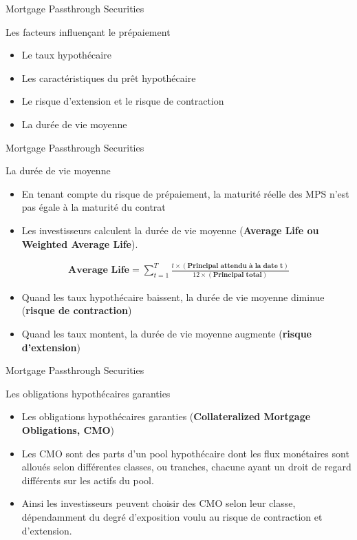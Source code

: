 \documentclass{beamer}
\begin{document}
\begin{frame}{Mortgage Passthrough Securities}
\begin{block}{Les facteurs influençant le prépaiement}
\begin{itemize}[label=\bullet]
\item Le taux hypothécaire
\item Les caractéristiques du prêt hypothécaire
\item Le risque d’extension et le risque de contraction
\item La durée de vie moyenne
\end{itemize}
\end{block}
\end{frame}


\begin{frame}{Mortgage Passthrough Securities}
\begin{block}{La durée de vie moyenne}
\begin{itemize}[label=\bullet]
\item En tenant compte du risque de prépaiement, la maturité réelle des MPS n’est pas égale à la maturité du contrat
\item Les investisseurs calculent la durée de vie moyenne (\textbf{Average Life ou Weighted Average Life}).
\end{itemize}
\begin{align*}
\textbf{Average Life}=\sum_{t=1}^T \frac{t \times(\textbf{Principal attendu à la date t})}{12 \times(\textbf{Principal total})}
\end{align*}
\begin{itemize}[label=\bullet]
\item Quand les taux hypothécaire baissent, la durée de vie moyenne diminue (\textbf{risque de contraction})
\item Quand les taux montent, la durée de vie moyenne augmente (\textbf{risque d’extension})
\end{itemize}
\end{block}
\end{frame}


\begin{frame}{Mortgage Passthrough Securities}
\begin{block}{Les obligations hypothécaires garanties}
\begin{itemize}[label=\bullet]
\item Les obligations hypothécaires garanties (\textbf{Collateralized Mortgage Obligations, CMO})
\item Les CMO sont des parts d’un pool hypothécaire dont les flux monétaires sont alloués selon différentes classes, ou tranches, chacune ayant un droit de regard différents sur les actifs du pool.
\item Ainsi les investisseurs peuvent choisir des CMO selon leur classe, dépendamment du degré d’exposition voulu au risque de contraction et d’extension.
\end{itemize}
\end{block}
\end{frame}
\end{document}
